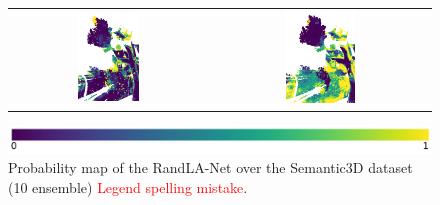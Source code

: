 \begin{figure}[h!]
\begin{tabular}{cc}
            \includegraphics[width=0.33\textwidth, height=0.18\textheight]{images/ood_imgs/de_sem3d/de_ent_10_3.png}&
            \includegraphics[width=0.33\textwidth, height=0.18\textheight]{images/sem3d_of/de_ent_sem3d_of_3.png}\\
        \end{tabular}
        \includegraphics[scale=0.45]{images/prob_legend.pdf}
        \caption{Probability map of the RandLA-Net over the Semantic3D dataset (10 ensemble) \textcolor{red}{Legend spelling mistake}.}
        \label{fig:de_entmap_vis_sem3d_OF}
    \end{figure}

